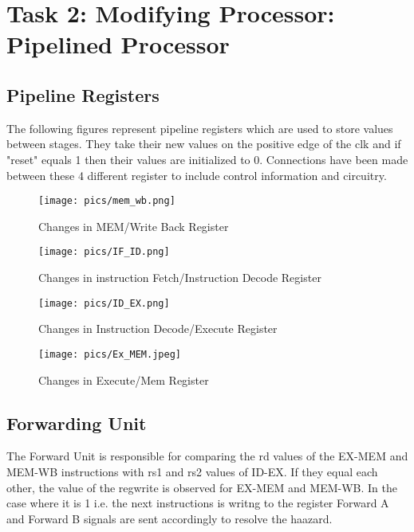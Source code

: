 \documentclass{article}
\begin{document}
\newpage

\section{Task 2: Modifying Processor: Pipelined Processor }
\subsection{{Pipeline Registers} }
The following figures represent pipeline registers which are used to store values between stages. They take their new values on the positive edge of the clk and if "reset" equals 1 then their values are initialized to 0. Connections have been made between these 4 different register to include control information and circuitry.

\begin{center}
    \begin{figure}[!htb]
        \centering
        \texttt{[image: pics/mem\_wb.png]}
        \caption{Changes in MEM/Write Back Register }
        \label{Snapshot of Memory}
    \end{figure}
\end{center}

\begin{center}
    \begin{figure}[!htb]
        \centering
        \texttt{[image: pics/IF\_ID.png]}
        \caption{Changes in instruction Fetch/Instruction Decode Register}
        \label{Snapshot of Memory}
    \end{figure}
\end{center}


\begin{center}
    \begin{figure}[!htb]
        \centering
        \texttt{[image: pics/ID\_EX.png]}
        \caption{Changes in Instruction Decode/Execute Register}
        \label{Snapshot of Memory}
    \end{figure}
\end{center}

\begin{center}
    \begin{figure}[!htb]
        \centering
        \texttt{[image: pics/Ex\_MEM.jpeg]}
        \caption{Changes in Execute/Mem Register}
        \label{Snapshot of Memory}
    \end{figure}
\end{center}

\subsection{{Forwarding Unit}}
The Forward Unit is responsible for comparing the rd values of the EX-MEM and MEM-WB instructions with rs1 and rs2 values of ID-EX. If they equal each other, the value of the regwrite is observed for EX-MEM and MEM-WB. In the case where it is 1 i.e. the next instructions is writng to the register Forward A and Forward B signals are sent accordingly to resolve the haazard.
\end{document}
